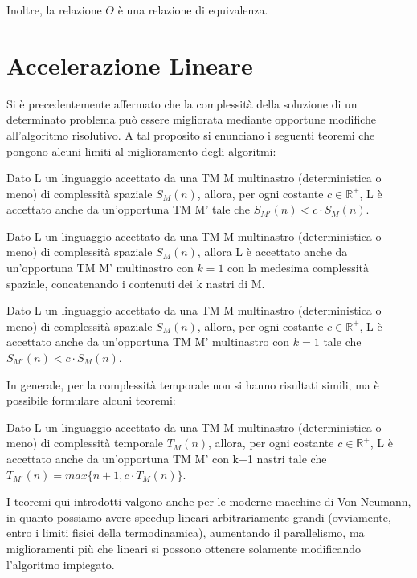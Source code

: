   Inoltre, la relazione \(\Theta\) è una relazione di equivalenza.

  \section{Accelerazione Lineare}
  Si è precedentemente affermato che la complessità della soluzione di un determinato problema può essere migliorata mediante opportune modifiche all'algoritmo risolutivo. A tal proposito si enunciano i seguenti teoremi che pongono alcuni limiti al miglioramento degli algoritmi:

  \begin{theorem}
    Dato L un linguaggio accettato da una TM M multinastro (deterministica o meno) di complessità spaziale \({S}_M(n)\), allora, per ogni costante \(c\in \mathbb{R}^+\), L è accettato anche da un'opportuna TM M' tale che \({S}_{M'}(n)<c\cdot{S}_M(n)\).
  \end{theorem}

  \begin{theorem}
    Dato L un linguaggio accettato da una TM M multinastro (deterministica o meno) di complessità spaziale \({S}_M(n)\), allora L è accettato anche da un'opportuna TM M' multinastro con \(k=1\) con la medesima complessità spaziale, concatenando i contenuti dei k nastri di M.
  \end{theorem}

  \begin{theorem}
    Dato L un linguaggio accettato da una TM M multinastro (deterministica o meno) di complessità spaziale \({S}_M(n)\), allora, per ogni costante \(c\in \mathbb{R}^+\), L è accettato anche da un'opportuna TM M' multinastro con \(k=1\) tale che \({S}_{M'}(n)<c\cdot{S}_M(n)\).
  \end{theorem}

  In generale, per la complessità temporale non si hanno risultati simili, ma è possibile formulare alcuni teoremi:

  \begin{theorem}
    Dato L un linguaggio accettato da una TM M multinastro (deterministica o meno) di complessità temporale \({T}_M(n)\), allora, per ogni costante \(c\in \mathbb{R}^+\), L è accettato anche da un'opportuna TM M' con k+1 nastri tale che \({T}_{M'}(n) = max\{n+1, c\cdot{T}_M(n)\}\).    
  \end{theorem}

  I teoremi qui introdotti valgono anche per le moderne macchine di Von Neumann, in quanto possiamo avere speedup lineari arbitrariamente grandi (ovviamente, entro i limiti fisici della termodinamica), aumentando il parallelismo, ma miglioramenti più che lineari si possono ottenere solamente modificando l'algoritmo impiegato. 

